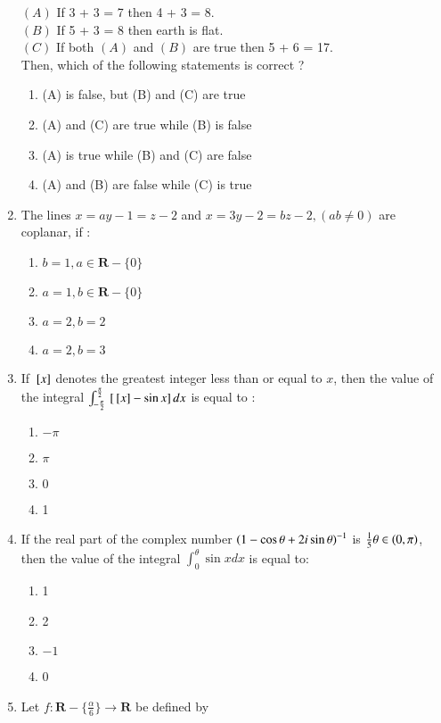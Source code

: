 \documentclass[journal]{IEEEtran}
\begin{document}
\begin{enumerate}
    $(A)$ If 3 + 3 = 7 then 4 + 3 = 8. \\ 
    $(B)$ If 5 + 3 = 8 then earth is flat.\\
    $(C)$ If both $(A)$ and $(B)$ are true then 5 + 6 = 17.\\
    Then, which of the following statements is correct ? 
    \begin{enumerate}
        \item (A) is false, but (B) and (C) are true 
        \item (A) and (C) are true while (B) is false
        \item (A) is true while (B) and (C) are false 
        \item (A) and (B) are false while (C) is true
    \end{enumerate}
    \item The lines $x = ay -1 = z 
- 2$ and $x = 3y -
 2 = bz -
 2, (ab \neq  
 0) $ are coplanar, if :
 \begin{enumerate}
     \item $b = 1 , a \in \textbf{R} - \{ 0 \}$
     \item $a = 1 , b \in \textbf{R} - \{ 0 \}$
     \item $a = 2, b = 2 $
     \item $ a =2 , b = 3$
 \end{enumerate}
   \item  If ${}\left[x\right]$ denotes the greatest integer less than or equal to $x$, then the value of the integral $\int_{-\frac{\pi}{2}}^{\frac{\pi}{2}} {}\left[{}\left[x\right] - \sin{x}\right]dx$ is equal to :
    \begin{enumerate}
        \item $-\pi$
        \item $\pi$
        \item $0$
        \item 1
    \end{enumerate}
    \item  If the real part of the complex number $\left(1 - \cos \theta + 2i \sin\theta\right)^{-1}$
  is $\frac{1}{5} \theta \in \left(0 , \pi\right)$, then the value of the integral $\int_{0}^{\theta} \sin xdx$ is equal to:
  \begin{enumerate}
      \item 1
      \item 2
      \item  $-1$
      \item 0
  \end{enumerate}
  \item Let $f : \textbf{R} - \{ \frac{\alpha}{6} \} \to \textbf{R}$ be defined by 

\end{enumerate}
\end{document}
